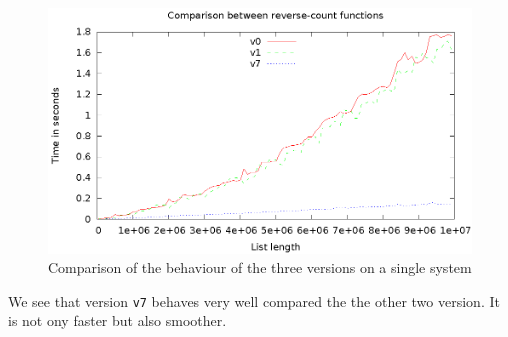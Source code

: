 \begin{figure}[htb]
\centering
\includegraphics{v0-v1-v7.eps}
\caption{\label{f-versions} Comparison of the behaviour of the three versions on a single system}
\end{figure}

We see that version \texttt{v7} behaves very well compared the the other two version.
It is not ony faster but also smoother.

